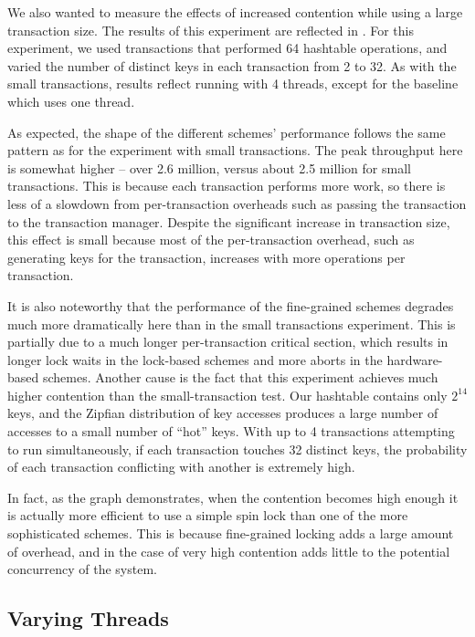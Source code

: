 We also wanted to measure the effects of increased contention while using a
large transaction size. The results of this experiment are reflected in
. For this experiment, we used transactions that performed
64 hashtable operations, and varied the number of distinct keys in each
transaction from 2 to 32. As with the small transactions, results reflect
running with 4 threads, except for the baseline which uses one thread.

As expected, the shape of the different schemes' performance follows the same
pattern as for the experiment with small transactions. The peak throughput here
is somewhat higher -- over 2.6 million, versus about 2.5 million for small
transactions. This is because each transaction performs more work, so there is
less of a slowdown from per-transaction overheads such as passing the
transaction to the transaction manager. Despite the significant increase in
transaction size, this effect is small because most of the per-transaction
overhead, such as generating keys for the transaction, increases with more
operations per transaction.

It is also noteworthy that the performance of the fine-grained schemes degrades
much more dramatically here than in the small transactions experiment. This is
partially due to a much longer per-transaction critical section, which results
in longer lock waits in the lock-based schemes and more aborts in the
hardware-based schemes. Another cause is the fact that this experiment achieves
much higher contention than the small-transaction test. Our hashtable contains
only $2^{14}$ keys, and the Zipfian distribution of key accesses produces a
large number of accesses to a small number of ``hot'' keys. With up to 4
transactions attempting to run simultaneously, if each transaction touches 32
distinct keys, the probability of each transaction conflicting with another is
extremely high.

In fact, as the graph demonstrates, when the contention becomes high enough it
is actually more efficient to use a simple spin lock than one of the more
sophisticated schemes. This is because fine-grained locking adds a large amount
of overhead, and in the case of very high contention adds little to the
potential concurrency of the system.

\subsection{Varying Threads}


